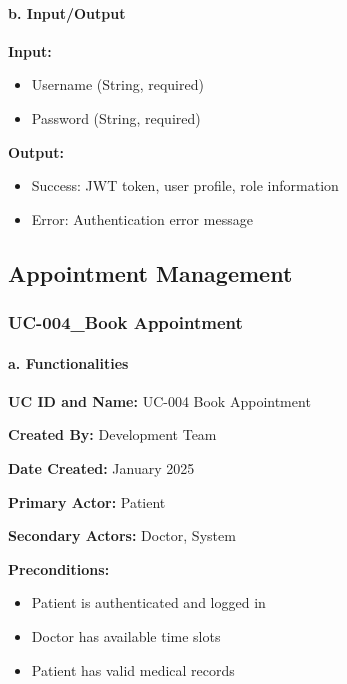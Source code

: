 \documentclass[12pt,a4paper]{article}
\begin{document}
\paragraph{b. Input/Output}

\textbf{Input:}
\begin{itemize}
    \item Username (String, required)
    \item Password (String, required)
\end{itemize}

\textbf{Output:}
\begin{itemize}
    \item Success: JWT token, user profile, role information
    \item Error: Authentication error message
\end{itemize}

\subsection{Appointment Management}

\subsubsection{UC-004\_Book Appointment}

\paragraph{a. Functionalities}

\textbf{UC ID and Name:} UC-004 Book Appointment

\textbf{Created By:} Development Team

\textbf{Date Created:} January 2025

\textbf{Primary Actor:} Patient

\textbf{Secondary Actors:} Doctor, System

\textbf{Preconditions:}
\begin{itemize}
    \item Patient is authenticated and logged in
    \item Doctor has available time slots
    \item Patient has valid medical records
\end{itemize}
\end{document}
